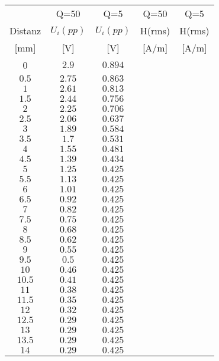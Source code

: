 \documentclass[12pt,a4paper,ngerman]{article}
\begin{document}
\centering
\begin{tabular}{ |c|c|c|c|c| }
  \hline
     & Q=50 & Q=5 & Q=50 & Q=5\\

    Distanz & $U_i(pp)$ & $U_i(pp)$ & H(rms) & H(rms)\\

  [mm] & [V] & [V] & [A/m] & [A/m] \\
  \hline
  0 & $2.9$ & $0.894$ & & \\
  \hline
  $0.5$ & $2.75$ & $0.863$ & & \\
  \hline
  $1$ & $2.61$ & $0.813$ & & \\
  \hline
  $1.5$ & $2.44$ & $0.756$ & & \\
    \hline
  $2$ & $2.25$ & $0.706$ & & \\
    \hline
  $2.5$ & $2.06$ & $0.637$ & & \\
    \hline
  $3$ & $1.89$ & $0.584$ & & \\
    \hline
  $3.5$ & $1.7$ & $0.531$ & & \\
    \hline
  $4$ & $1.55$ & $0.481$ & & \\
    \hline
  $4.5$ & $1.39$ & $0.434$ & & \\
    \hline
  $5$ & $1.25$ & $0.425$ & & \\
    \hline
  $5.5$ & $1.13$ & $0.425$ & & \\
     \hline
  $6$ & $1.01$ & $0.425$ & & \\
      \hline
  $6.5$ & $0.92$ & $0.425$ & & \\ 
      \hline
  $7$ & $0.82$ & $0.425$ & & \\
      \hline
  $7.5$ & $0.75$ & $0.425$ & & \\
      \hline
  $8$ & $0.68$ & $0.425$ & & \\
      \hline
  $8.5$ & $0.62$ & $0.425$ & & \\
      \hline
  $9$ & $0.55$ & $0.425$ & & \\
      \hline
  $9.5$ & $0.5$ & $0.425$ & & \\
      \hline
  $10$ & $0.46$ & $0.425$ & & \\
      \hline
  $10.5$ & $0.41$ & $0.425$ & & \\
      \hline
  $11$ & $0.38$ & $0.425$ & & \\
      \hline
  $11.5$ & $0.35$ & $0.425$ & & \\
      \hline
  $12$ & $0.32$ & $0.425$ & & \\
      \hline
  $12.5$ & $0.29$ & $0.425$ & & \\
      \hline
  $13$ & $0.29$ & $0.425$ & & \\
      \hline
  $13.5$ & $0.29$ & $0.425$ & & \\
        \hline
  $14$ & $0.29$ & $0.425$ & & \\
  \hline
 
\end{tabular}
\end{document}
